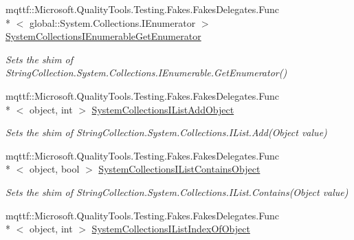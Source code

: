\begin{DoxyCompactItemize}
mqttf\-::\-Microsoft.\-Quality\-Tools.\-Testing.\-Fakes.\-Fakes\-Delegates.\-Func\\*
$<$ global\-::\-System.\-Collections.\-I\-Enumerator $>$ \hyperlink{class_system_1_1_collections_1_1_specialized_1_1_fakes_1_1_shim_string_collection_a71262486ced59e4656222022d973a0a0}{System\-Collections\-I\-Enumerable\-Get\-Enumerator}
\begin{DoxyCompactList}\small\item\em Sets the shim of String\-Collection.\-System.\-Collections.\-I\-Enumerable.\-Get\-Enumerator()\end{DoxyCompactList}\item 
mqttf\-::\-Microsoft.\-Quality\-Tools.\-Testing.\-Fakes.\-Fakes\-Delegates.\-Func\\*
$<$ object, int $>$ \hyperlink{class_system_1_1_collections_1_1_specialized_1_1_fakes_1_1_shim_string_collection_aef91020ed4e338be2eb5af1287787ef1}{System\-Collections\-I\-List\-Add\-Object}
\begin{DoxyCompactList}\small\item\em Sets the shim of String\-Collection.\-System.\-Collections.\-I\-List.\-Add(\-Object value)\end{DoxyCompactList}\item 
mqttf\-::\-Microsoft.\-Quality\-Tools.\-Testing.\-Fakes.\-Fakes\-Delegates.\-Func\\*
$<$ object, bool $>$ \hyperlink{class_system_1_1_collections_1_1_specialized_1_1_fakes_1_1_shim_string_collection_ac1821e5540a539b47b5e03b63fe61663}{System\-Collections\-I\-List\-Contains\-Object}
\begin{DoxyCompactList}\small\item\em Sets the shim of String\-Collection.\-System.\-Collections.\-I\-List.\-Contains(\-Object value)\end{DoxyCompactList}\item 
mqttf\-::\-Microsoft.\-Quality\-Tools.\-Testing.\-Fakes.\-Fakes\-Delegates.\-Func\\*
$<$ object, int $>$ \hyperlink{class_system_1_1_collections_1_1_specialized_1_1_fakes_1_1_shim_string_collection_a3970ac4743055ed185b5ad21a0e0efdd}{System\-Collections\-I\-List\-Index\-Of\-Object}

\end{DoxyCompactItemize}
